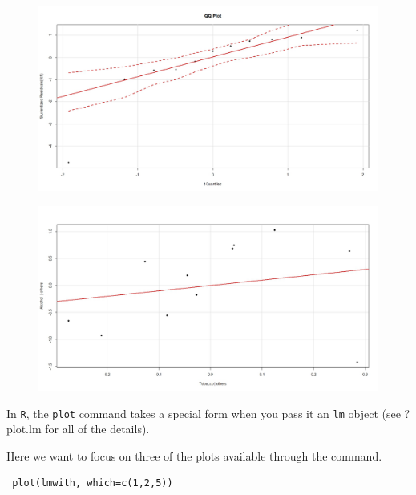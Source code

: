 \documentclass[residuals.tex]{subfiles}
\begin{document}
\begin{figure}
\centering
\includegraphics[width=1.2\linewidth]{alcotob3}
\end{figure}


\begin{figure}
	\centering
	\includegraphics[width=1.2\linewidth]{alcotob4}
\end{figure}


In \texttt{R}, the \texttt{plot} command takes a
special form when you pass it an \texttt{lm} object (see ?plot.lm for all of the
details). 




Here we want to focus on three of the plots available through
the command.


 \begin{framed}
 	\begin{verbatim}
 plot(lmwith, which=c(1,2,5))
 \end{verbatim}
\end{framed}
\end{document}
